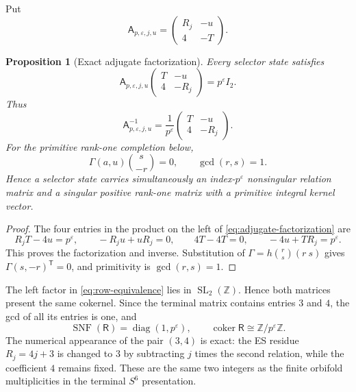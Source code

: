 \documentclass[11pt]{article}
\newtheorem{proposition}[theorem]{Proposition}
\theoremstyle{definition}
\theoremstyle{remark}
\newcommand{\Z}{\mathbb Z}
\newcommand{\diag}{\operatorname{diag}}
\newcommand{\coker}{\operatorname{coker}}
\newcommand{\SNF}{\operatorname{SNF}}
\begin{document}
Put
\begin{equation}\label{eq:selector-relation-matrix}
 \mathsf A_{p,\varepsilon,j,u}
 =\begin{pmatrix}R_j&-u\\4&-T\end{pmatrix}.
\end{equation}

\begin{proposition}[Exact adjugate factorization]
\label{prop:adjugate-factorization}
Every selector state satisfies
\begin{equation}\label{eq:adjugate-factorization}
 \mathsf A_{p,\varepsilon,j,u}
 \begin{pmatrix}T&-u\\4&-R_j\end{pmatrix}
 =p^\varepsilon I_2.
\end{equation}
Thus
\begin{equation}\label{eq:A-inverse}
 \mathsf A_{p,\varepsilon,j,u}^{-1}
 =\frac1{p^\varepsilon}
 \begin{pmatrix}T&-u\\4&-R_j\end{pmatrix}.
\end{equation}
For the primitive rank-one completion below,
\begin{equation}\label{eq:Gamma-primitive-kernel}
 \Gamma(a,u)\binom{s}{-r}=0,
 \qquad \gcd(r,s)=1.
\end{equation}
Hence a selector state carries simultaneously an index-\(p^\varepsilon\)
nonsingular relation matrix and a singular positive rank-one matrix with a
primitive integral kernel vector.
\end{proposition}

\begin{proof}
The four entries in the product on the left of
\eqref{eq:adjugate-factorization} are
\[
 R_jT-4u=p^\varepsilon,
 \qquad -R_ju+uR_j=0,
 \qquad 4T-4T=0,
 \qquad -4u+TR_j=p^\varepsilon.
\]
This proves the factorization and inverse.  Substitution of
\(\Gamma=h\binom r s(r\ s)\) gives
\(\Gamma(s,-r)^{\mathsf T}=0\), and primitivity is
\(\gcd(r,s)=1\).
\end{proof}

The left factor in \eqref{eq:row-equivalence} lies in
$\operatorname{SL}_2(\Z)$.  Hence both matrices present the same cokernel.
Since the terminal matrix contains entries $3$ and $4$, the gcd of all its
entries is one, and
\begin{equation}\label{eq:SNF}
 \SNF(\mathsf R)=\diag(1,p^\varepsilon),
 \qquad
 \coker\mathsf R\cong\Z/p^\varepsilon\Z.
\end{equation}
The numerical appearance of the pair $(3,4)$ is exact: the ES residue
$R_j=4j+3$ is changed to $3$ by subtracting $j$ times the second relation,
while the coefficient $4$ remains fixed.  These are the same two integers as
the finite orbifold multiplicities in the terminal $S^6$ presentation.
\end{document}
